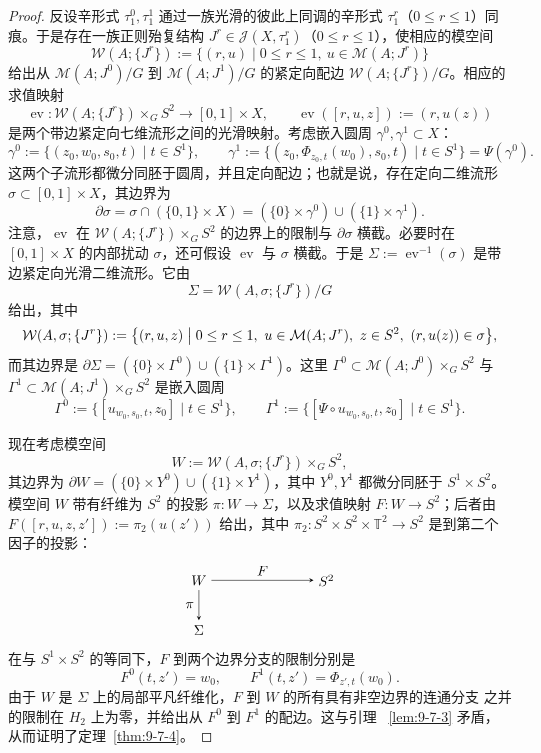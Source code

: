 \begin{proof}
反设辛形式 $\tau_1^0,\tau_1^1$ 通过一族光滑的彼此上同调的辛形式
$\tau_1^r$（$0\le r\le1$）同痕。于是存在一族正则殆复结构
$J^r\in\mathcal J(X,\tau_1^r)$（$0\le r\le1$），使相应的模空间
\[
  \mathcal W(A;\{J^r\})
  :=\{(r,u)\mid0\le r\le1,\ u\in\mathcal M(A;J^r)\}
\]
给出从 $\mathcal M(A;J^0)/G$ 到 $\mathcal M(A;J^1)/G$ 的紧定向配边
$\mathcal W(A;\{J^r\})/G$。相应的求值映射
\[
  \operatorname{ev}:\mathcal W(A;\{J^r\})\times_GS^2
  \longrightarrow[0,1]\times X,
  \qquad \operatorname{ev}([r,u,z]):=(r,u(z))
\]
是两个带边紧定向七维流形之间的光滑映射。考虑嵌入圆周
$\gamma^0,\gamma^1\subset X$：
\[
  \gamma^0:=\{(z_0,w_0,s_0,t)\mid t\in S^1\},
  \qquad
  \gamma^1:=\{(z_0,\Phi_{z_0,t}(w_0),s_0,t)\mid t\in S^1\}
  =\Psi(\gamma^0).
\]
这两个子流形都微分同胚于圆周，并且定向配边；也就是说，存在定向二维流形
$\sigma\subset[0,1]\times X$，其边界为
\[
  \partial\sigma
  =\sigma\cap(\{0,1\}\times X)
  =(\{0\}\times\gamma^0)\cup(\{1\}\times\gamma^1).
\]
注意，$\operatorname{ev}$ 在
$\mathcal W(A;\{J^r\})\times_GS^2$ 的边界上的限制与 $\partial\sigma$ 横截。必要时在
$[0,1]\times X$ 的内部扰动 $\sigma$，还可假设 $\operatorname{ev}$ 与 $\sigma$
横截。于是
$\Sigma:=\operatorname{ev}^{-1}(\sigma)$ 是带边紧定向光滑二维流形。它由
\[
  \Sigma=\mathcal W(A,\sigma;\{J^r\})/G
\]
给出，其中
\[
  \mathcal W(A,\sigma;\{J^r\})
  :=\bigl\{(r,u,z)\bigm|0\le r\le1,\ u\in\mathcal M(A;J^r),\ z\in S^2,
  \ (r,u(z))\in\sigma\bigr\},
\]
而其边界是
$\partial\Sigma=(\{0\}\times\Gamma^0)\cup(\{1\}\times\Gamma^1)$。这里
$\Gamma^0\subset\mathcal M(A;J^0)\times_GS^2$ 与
$\Gamma^1\subset\mathcal M(A;J^1)\times_GS^2$ 是嵌入圆周
\[
  \Gamma^0:=\{[u_{w_0,s_0,t},z_0]\mid t\in S^1\},
  \qquad
  \Gamma^1:=\{[\Psi\circ u_{w_0,s_0,t},z_0]\mid t\in S^1\}.
\]

现在考虑模空间
\[
  W:=\mathcal W(A,\sigma;\{J^r\})\times_GS^2,
\]
其边界为 $\partial W=(\{0\}\times Y^0)\cup(\{1\}\times Y^1)$，其中
$Y^0,Y^1$ 都微分同胚于 $S^1\times S^2$。模空间 $W$ 带有纤维为 $S^2$ 的投影
$\pi:W\to\Sigma$，以及求值映射 $F:W\to S^2$；后者由
$F([r,u,z,z']):=\pi_2(u(z'))$ 给出，其中
$\pi_2:S^2\times S^2\times\mathbb T^2\to S^2$ 是到第二个因子的投影：
\[
\begin{tikzpicture}[baseline=(current bounding box.center),>=stealth]
  \node (w) at (0,0) {$W$};
  \node (s2) at (3.2,0) {$S^2$};
  \node (sig) at (0,-1.25) {$\Sigma$};
  \draw[->] (w) -- node[above] {$F$} (s2);
  \draw[->] (w) -- node[left] {$\pi$} (sig);
\end{tikzpicture}
\]
在与 $S^1\times S^2$ 的等同下，$F$ 到两个边界分支的限制分别是
\[
  F^0(t,z')=w_0,
  \qquad
  F^1(t,z')=\Phi_{z',t}(w_0).
\]
由于 $W$ 是 $\Sigma$ 上的局部平凡纤维化，$F$ 到 $W$ 的所有具有非空边界的连通分支
之并的限制在 $H_2$ 上为零，并给出从 $F^0$ 到 $F^1$ 的配边。这与引理
~\ref{lem:9-7-3} 矛盾，从而证明了定理~\ref{thm:9-7-4}。
\end{proof}

